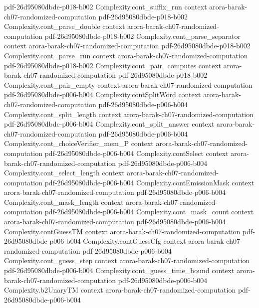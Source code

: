 \begin{theorem}
  {pdf-26d95080dbde-p018-b002}
\proofstep
  {Complexity.cont_suffix_run}
  {context}
  {arora-barak-ch07-randomized-computation}
  {pdf-26d95080dbde-p018-b002}
\proofstep
  {Complexity.cont_parse_double}
  {context}
  {arora-barak-ch07-randomized-computation}
  {pdf-26d95080dbde-p018-b002}
\proofstep
  {Complexity.cont_parse_separator}
  {context}
  {arora-barak-ch07-randomized-computation}
  {pdf-26d95080dbde-p018-b002}
\proofstep
  {Complexity.cont_parse_run}
  {context}
  {arora-barak-ch07-randomized-computation}
  {pdf-26d95080dbde-p018-b002}
\proofstep
  {Complexity.cont_pair_computes}
  {context}
  {arora-barak-ch07-randomized-computation}
  {pdf-26d95080dbde-p018-b002}
\proofstep
  {Complexity.cont_pair_empty}
  {context}
  {arora-barak-ch07-randomized-computation}
  {pdf-26d95080dbde-p006-b004}
\proofstep
  {Complexity.contSplitWord}
  {context}
  {arora-barak-ch07-randomized-computation}
  {pdf-26d95080dbde-p006-b004}
\proofstep
  {Complexity.cont_split_length}
  {context}
  {arora-barak-ch07-randomized-computation}
  {pdf-26d95080dbde-p006-b004}
\proofstep
  {Complexity.cont_split_answer}
  {context}
  {arora-barak-ch07-randomized-computation}
  {pdf-26d95080dbde-p006-b004}
\proofstep
  {Complexity.cont_choiceVerifier_mem_P}
  {context}
  {arora-barak-ch07-randomized-computation}
  {pdf-26d95080dbde-p006-b004}
\proofstep
  {Complexity.contSelect}
  {context}
  {arora-barak-ch07-randomized-computation}
  {pdf-26d95080dbde-p006-b004}
\proofstep
  {Complexity.cont_select_length}
  {context}
  {arora-barak-ch07-randomized-computation}
  {pdf-26d95080dbde-p006-b004}
\proofstep
  {Complexity.contEmissionMask}
  {context}
  {arora-barak-ch07-randomized-computation}
  {pdf-26d95080dbde-p006-b004}
\proofstep
  {Complexity.cont_mask_length}
  {context}
  {arora-barak-ch07-randomized-computation}
  {pdf-26d95080dbde-p006-b004}
\proofstep
  {Complexity.cont_mask_count}
  {context}
  {arora-barak-ch07-randomized-computation}
  {pdf-26d95080dbde-p006-b004}
\proofstep
  {Complexity.contGuessTM}
  {context}
  {arora-barak-ch07-randomized-computation}
  {pdf-26d95080dbde-p006-b004}
\proofstep
  {Complexity.contGuessCfg}
  {context}
  {arora-barak-ch07-randomized-computation}
  {pdf-26d95080dbde-p006-b004}
\proofstep
  {Complexity.cont_guess_step}
  {context}
  {arora-barak-ch07-randomized-computation}
  {pdf-26d95080dbde-p006-b004}
\proofstep
  {Complexity.cont_guess_time_bound}
  {context}
  {arora-barak-ch07-randomized-computation}
  {pdf-26d95080dbde-p006-b004}
\proofstep
  {Complexity.b2UnaryTM}
  {context}
  {arora-barak-ch07-randomized-computation}
  {pdf-26d95080dbde-p006-b004}

\end{theorem}
